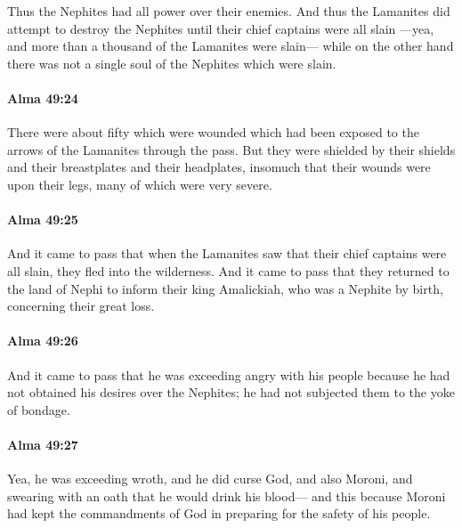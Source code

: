 			Thus the Nephites had all power over their enemies.
			And thus the Lamanites did attempt to destroy the Nephites
			until their chief captains were all slain
			---yea, and more than a thousand of the Lamanites were slain---
			while on the other hand
			there was not a single soul of the Nephites which were slain.

		\paragraph{Alma 49:24} %
			\label{ALMA-49-24}

			There were about fifty which were wounded
			which had been exposed to the arrows of the Lamanites through the pass.
			But they were shielded by their shields and their breastplates and their headplates,
			insomuch that their wounds were upon their legs,
			many of which were very severe.

		\paragraph{Alma 49:25} %
			\label{ALMA-49-25}

			And it came to pass that when the Lamanites saw
			that their chief captains were all slain,
			they fled into the wilderness.
			And it came to pass that they returned to the land of Nephi
			to inform their king Amalickiah, who was a Nephite by birth,
			concerning their great loss.

		\paragraph{Alma 49:26} %
			\label{ALMA-49-26}

			And it came to pass that he was exceeding angry with his people
			because he had not obtained his desires over the Nephites;
			he had not subjected them to the yoke of bondage.

		\paragraph{Alma 49:27} %
			\label{ALMA-49-27}

			Yea, he was exceeding wroth,
			and he did curse God, and also Moroni,
			and swearing with an oath that he would drink his blood---
			and this because Moroni had kept the commandments of God
			in preparing for the safety of his people.

